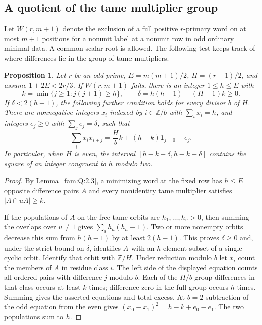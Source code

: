 \documentclass[11pt,a4paper]{article}
\numberwithin{equation}{section}
\newtheorem{proposition}[theorem]{Proposition}
\theoremstyle{remark}
\begin{document}
\subsection{A quotient of the tame multiplier group}\label{found:T:9}
\label{found:T:key:sec:multiplier-quotient}
Let $W(r,m+1)$ denote the exclusion of a full positive $r$-primary word on at most $m+1$ positions for a nonunit label at a nonunit row in odd ordinary minimal data. A common scalar root is allowed. The following test keeps track of where differences lie in the group of tame multipliers.

\begin{proposition}\label{found:T:9.1}\label{found:T:key:prop:quotient-word}
Let $r$ be an odd prime, $E=m(m+1)/2$, $H=(r-1)/2$, and assume $1+2E<2r/3$. If $W(r,m+1)$ fails, there is an integer $1\le h\le E$ with
\[
 k=\min\{j\ge1:j(j+1)\ge h\},\qquad
 \delta=h(h-1)-(H-1)k\ge0.
\]
If $\delta<2(h-1)$, the following further condition holds for every divisor $b$ of $H$. There are nonnegative integers $x_i$ indexed by $i\in\mathbb Z/b$ with $\sum_i x_i=h$, and integers $e_j\ge0$ with $\sum_j e_j=\delta$, such that
\[
 \sum_i x_i x_{i+j}=\frac Hb k+(h-k)\mathbf1_{j=0}+e_j.
\]
In particular, when $H$ is even, the interval $[h-k-\delta,h-k+\delta]$ contains the square of an integer congruent to $h$ modulo two.
\end{proposition}
\begin{proof}
By Lemma~\ref{fam:Q:2.3}, a minimizing word at the fixed row
has $h\le E$ opposite difference pairs $A$ and every nonidentity
tame multiplier satisfies $|A\cap uA|\ge k$.

If the populations of $A$ on the free tame orbits are $h_1,\dots,h_v>0$, then summing the overlaps over $u\ne1$ gives $\sum_a h_a(h_a-1)$. Two or more nonempty orbits decrease this sum from $h(h-1)$ by at least $2(h-1)$. This proves $\delta\ge0$ and, under the strict bound on $\delta$, identifies $A$ with an $h$-element subset of a single cyclic orbit. Identify that orbit with $\mathbb Z/H$. Under reduction modulo $b$ let $x_i$ count the members of $A$ in residue class $i$. The left side of the displayed equation counts all ordered pairs with difference $j$ modulo $b$. Each of the $H/b$ group differences in that class occurs at least $k$ times; difference zero in the full group occurs $h$ times. Summing gives the asserted equations and total excess. At $b=2$ subtraction of the odd equation from the even gives $(x_0-x_1)^2=h-k+e_0-e_1$. The two populations sum to $h$.
\end{proof}
\end{document}
